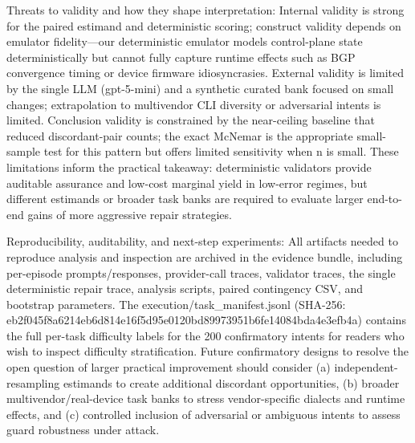 \documentclass[conference]{IEEEtran}
\begin{document}
Threats to validity and how they shape interpretation: Internal validity is strong for the paired estimand and deterministic scoring; construct validity depends on emulator fidelity---our deterministic emulator models control-plane state deterministically but cannot fully capture runtime effects such as BGP convergence timing or device firmware idiosyncrasies. External validity is limited by the single LLM (gpt-5-mini) and a synthetic curated bank focused on small changes; extrapolation to multivendor CLI diversity or adversarial intents is limited. Conclusion validity is constrained by the near-ceiling baseline that reduced discordant-pair counts; the exact McNemar is the appropriate small-sample test for this pattern but offers limited sensitivity when n is small. These limitations inform the practical takeaway: deterministic validators provide auditable assurance and low-cost marginal yield in low-error regimes, but different estimands or broader task banks are required to evaluate larger end-to-end gains of more aggressive repair strategies.

Reproducibility, auditability, and next-step experiments: All artifacts needed to reproduce analysis and inspection are archived in the evidence bundle, including per-episode prompts/responses, provider-call traces, validator traces, the single deterministic repair trace, analysis scripts, paired contingency CSV, and bootstrap parameters. The execution/task\_manifest.jsonl (SHA-256: eb2f045f\allowbreak{}8a6214eb\allowbreak{}6d814e16\allowbreak{}f5d95e01\allowbreak{}20bd8997\allowbreak{}3951b6fe\allowbreak{}14084bda\allowbreak{}4e3efb4a) contains the full per-task difficulty labels for the 200 confirmatory intents for readers who wish to inspect difficulty stratification. Future confirmatory designs to resolve the open question of larger practical improvement should consider (a) independent-resampling estimands to create additional discordant opportunities, (b) broader multivendor/real-device task banks to stress vendor-specific dialects and runtime effects, and (c) controlled inclusion of adversarial or ambiguous intents to assess guard robustness under attack.
\end{document}
